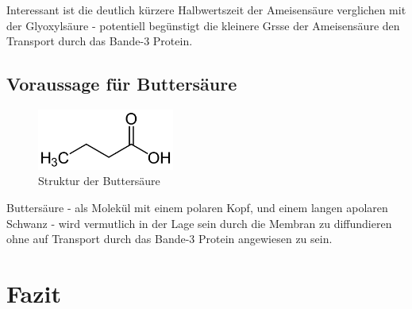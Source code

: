 \documentclass[a4paper,german]{scrreprt}
\begin{document}
Interessant ist die deutlich kürzere Halbwertszeit der Ameisensäure verglichen
mit der Glyoxylsäure - potentiell begünstigt die kleinere Grsse der
Ameisensäure den Transport durch das Bande-3 Protein.

\section{Voraussage für Buttersäure}

\begin{figure}[h]
	\centering
	\includegraphics[width=0.4\textwidth]{img/buttersaeure}
	\caption{Struktur der Buttersäure}
	\label{fig:buttersaeure}
\end{figure}

Buttersäure - als Molekül mit einem polaren Kopf, und einem langen apolaren
Schwanz - wird vermutlich in der Lage sein durch die Membran zu diffundieren
ohne auf Transport durch das Bande-3 Protein angewiesen zu sein.

\chapter{Fazit}








\end{document}
